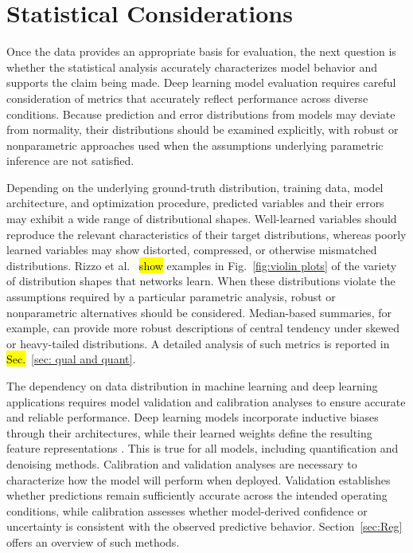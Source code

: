 \section{Statistical Considerations}
Once the data provides an appropriate basis for evaluation, the next question is whether the statistical analysis accurately characterizes model behavior and supports the claim being made. Deep learning model evaluation requires careful consideration of metrics that accurately reflect performance across diverse conditions. Because prediction and error distributions from \DL models may deviate from normality, their distributions should be examined explicitly, with robust or nonparametric approaches used when the assumptions underlying parametric inference are not satisfied.

Depending on the underlying ground-truth distribution, training data, model architecture, and optimization procedure, predicted variables and their errors may exhibit a wide range of distributional shapes. Well-learned variables should reproduce the relevant characteristics of their target distributions, whereas poorly learned variables may show distorted, compressed, or otherwise mismatched distributions. Rizzo et al.~\cite{Rizzo2023} \hl{show} examples in Fig.~\ref{fig:violin plots} of the variety of distribution shapes that networks learn. When these distributions violate the assumptions required by a particular parametric analysis, robust or nonparametric alternatives should be considered. Median-based summaries, for example, can provide more robust descriptions of central tendency under skewed or heavy-tailed distributions. A detailed analysis of such metrics is reported in \hl{Sec.}~\ref{sec: qual and quant}.

The dependency on data distribution in machine learning and deep learning applications requires model validation and calibration analyses to ensure accurate and reliable performance. Deep learning models incorporate inductive biases through their architectures, while their learned weights define the resulting feature representations \cite{Geirhos2020}. This is true for all \DL models, including quantification and denoising methods. Calibration and validation analyses are necessary to characterize how the model will perform when deployed. Validation establishes whether predictions remain sufficiently accurate across the intended operating conditions, while calibration assesses whether model-derived confidence or uncertainty is consistent with the observed predictive behavior. Section~\ref{sec:Reg} offers an overview of such methods.

